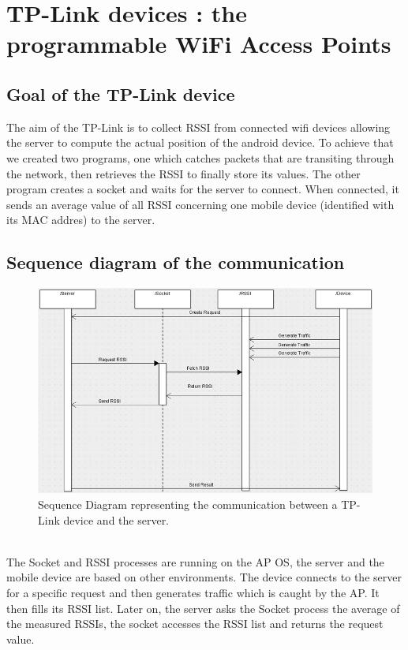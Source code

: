 \chapter{TP-Link devices : the programmable WiFi Access Points}
 \section{Goal of the TP-Link device}
  The aim of the TP-Link is to collect RSSI from connected wifi devices allowing the server to compute the actual position of the android device. To achieve that we created two programs, one which catches packets that are transiting through the network, then retrieves the RSSI to finally store its values. The other program creates a socket and waits for the server to connect. When connected, it sends an average value of all RSSI concerning one mobile device (identified with its MAC addres) to the server.
  \section{Sequence diagram of the communication}
   
     \begin{figure}[H]
      \centering
       \includegraphics[scale = 0.5]{img/tp_link/tplink_sq_diag}
      \caption{Sequence Diagram representing the communication between a TP-Link device and the server.}
      \label{fig:tplink_seq_diagram}
     \end{figure}
    ~\\
\indent The Socket and RSSI processes are running on the AP OS, the server and the mobile device are based on other environments. The device connects to the server for a specific request and then generates traffic which is caught by the AP. It then fills its RSSI list. Later on, the server asks the Socket process the average of the measured RSSIs, the socket accesses the RSSI list and returns the request value.

